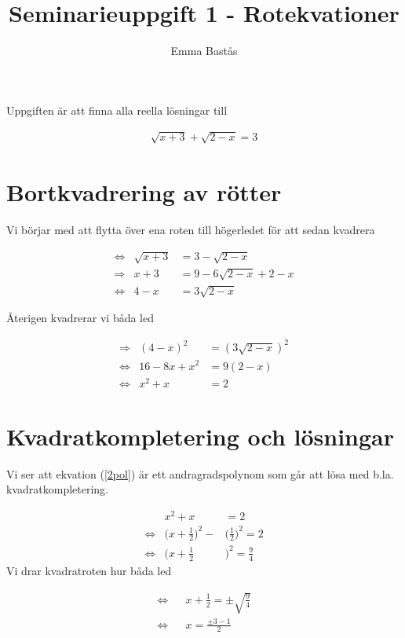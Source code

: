 \documentclass{article}
\title{Seminarieuppgift 1 - Rotekvationer}
\author{Emma Bastås}
\begin{document}
\maketitle

Uppgiften är att finna alla reella lösningar till

\begin{gather*}
  \sqrt{x + 3} + \sqrt{2 - x} = 3 \label{orig}\tag{0}
\end{gather*}

\section*{Bortkvadrering av rötter}

Vi börjar med att flytta över ena roten till högerledet för att sedan kvadrera

\begin{align}
  &\Leftrightarrow  &\sqrt{x + 3}   &= 3 - \sqrt{2 - x} &\\
  &\Rightarrow      &x + 3          &= 9 - 6\sqrt{2 - x} + 2 - x & \label{kvad1}\\
  &\Leftrightarrow  &4 - x          &= 3\sqrt{2 - x} &
\end{align}

Återigen kvadrerar vi båda led

\begin{align}
  &\Rightarrow &(4 - x)^2 &= (3\sqrt{2 - x})^2 & \label{kvad2}\\
  &\Leftrightarrow &16 - 8x + x^2 &= 9(2 - x) &\\
  &\Leftrightarrow &x^2+ x &= 2 &  \label{2pol}
\end{align}

\section*{Kvadratkompletering och lösningar}

Vi ser att ekvation (\ref{2pol}) är ett andragradspolynom som går att lösa med b.la. kvadratkompletering.

\begin{align}
  & &x^2 + x &= 2 &\\[6pt]
  &\Leftrightarrow &\biggl(x + \frac{1}{2}\biggr)^2 - &\biggl(\frac{1}{2}\biggr)^2 = 2 &\\[6pt]
  &\Leftrightarrow &\biggl(x + \frac{1}{2}&\biggr)^2 = \frac{9}{4} &
\end{align}
Vi drar kvadratroten hur båda led

\begin{align}
  &\Leftrightarrow  && x + \frac{1}{2} = \pm \sqrt{\frac{9}{4}} & \\[10pt]
  &\Leftrightarrow  && x = \frac{ \pm 3 - 1 }{ 2 } &
\end{align}
\end{document}

